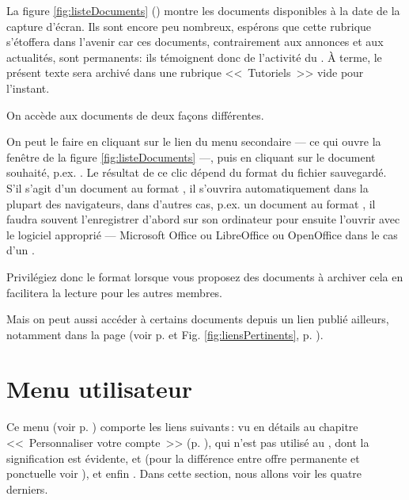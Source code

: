 La figure \ref{fig:listeDocuments} () montre les documents disponibles à la date de la capture d'écran. Ils sont encore peu nombreux, espérons que cette rubrique s’étoffera dans l’avenir car ces documents, contrairement aux annonces et aux actualités, sont permanents: ils témoignent donc de l'activité du \sel. À terme, le présent texte sera archivé dans une rubrique <<~Tutoriels~>> vide pour l'instant.

On accède aux documents de deux  façons différentes.

On peut le faire  en cliquant sur le lien  du menu secondaire --- ce qui ouvre la fenêtre de la figure \ref{fig:listeDocuments} ---, puis en cliquant sur le document souhaité, p.ex. . Le résultat de ce clic dépend du format du fichier sauvegardé. S’il s’agit d’un document au format , il s’ouvrira automatiquement dans la plupart des navigateurs, dans d’autres cas, p.ex. un document au format , il faudra souvent l’enregistrer d'abord sur son ordinateur pour ensuite l’ouvrir avec le logiciel approprié --- Microsoft Office ou LibreOffice ou OpenOffice dans le cas d’un . 

Privilégiez donc le format  lorsque vous proposez des documents à archiver cela en facilitera la lecture pour les autres membres.

Mais on peut aussi accéder à certains documents depuis un lien publié ailleurs, notamment dans la page  (voir p. \pageref{page:lienIci} et Fig. \ref{fig:liensPertinents}, p. \pageref{fig:liensPertinents}).

\section{Menu utilisateur}
\label{sec:menuUtilisateur2}

Ce menu (voir p. \pageref{fig:menuUtilisateur}) comporte les liens suivants\,:    vu en détails au chapitre <<~Personnaliser votre compte~>> (p. \pageref{chap:personnaliserCompte}),  qui n'est pas utilisé au \CdS,  dont la signification est évidente,  et  (pour la différence entre offre permanente et ponctuelle voir ),  et enfin . Dans cette section, nous allons voir les quatre derniers.

